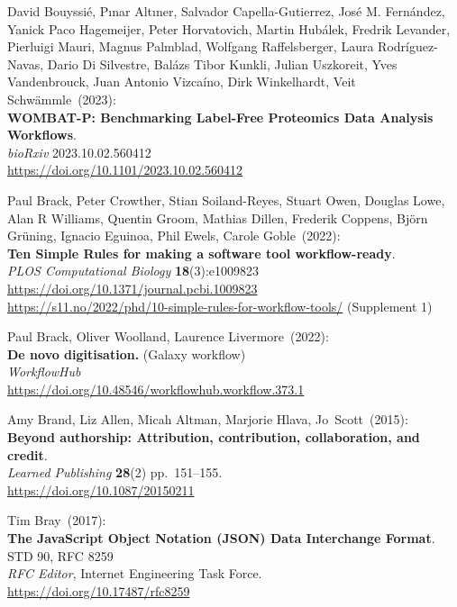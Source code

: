 \begin{thebibliography}{9}
David Bouyssié, Pınar Altıner, Salvador Capella-Gutierrez, José M. Fernández, Yanick Paco Hagemeijer, Peter Horvatovich, Martin Hubálek, Fredrik Levander, Pierluigi Mauri, Magnus Palmblad, Wolfgang Raffelsberger, Laura Rodríguez-Navas, Dario Di Silvestre, Balázs Tibor Kunkli, Julian Uszkoreit, Yves Vandenbrouck, Juan Antonio Vizcaíno, Dirk Winkelhardt, Veit Schwämmle~(2023): \\
\textbf{WOMBAT-P: Benchmarking Label-Free Proteomics Data Analysis Workflows}.\\
\emph{bioRxiv} 2023.10.02.560412 \\
\url{https://doi.org/10.1101/2023.10.02.560412}


Paul Brack, Peter Crowther, Stian Soiland-Reyes, Stuart Owen,
Douglas Lowe, Alan R Williams, Quentin Groom, Mathias Dillen, Frederik
Coppens, Björn Grüning, Ignacio Eguinoa, Phil Ewels, Carole Goble~(2022): \\
\textbf{Ten Simple Rules for making a software tool workflow-ready}.\\
\emph{PLOS Computational Biology} \textbf{18}(3):e1009823\\
\url{https://doi.org/10.1371/journal.pcbi.1009823}\\
\url{https://s11.no/2022/phd/10-simple-rules-for-workflow-tools/}
(Supplement 1)

Paul Brack, Oliver Woolland, Laurence Livermore~(2022): \\
\textbf{De novo digitisation.} (Galaxy workflow)\\
\emph{WorkflowHub}\\
\url{https://doi.org/10.48546/workflowhub.workflow.373.1}

Amy Brand, Liz Allen, Micah Altman, Marjorie Hlava, Jo~Scott~(2015): \\
\textbf{Beyond authorship: Attribution, contribution, collaboration, and
credit}.\\
\emph{Learned Publishing} \textbf{28}(2) pp.~151--155.\\
\url{https://doi.org/10.1087/20150211}

Tim Bray~(2017): \\
\textbf{The JavaScript Object Notation (JSON) Data
Interchange Format}.\\
STD 90, RFC 8259\\
\emph{RFC Editor}, 
Internet Engineering Task Force.\\
\url{https://doi.org/10.17487/rfc8259}


\end{thebibliography}
